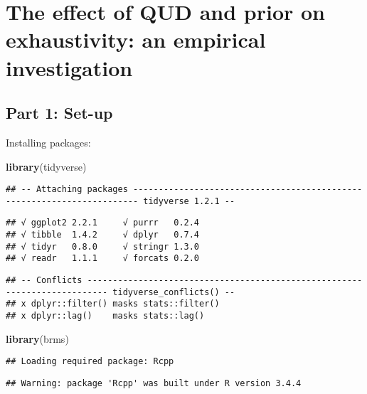 \documentclass[]{article}
\title{}
\author{}
\date{}
\newenvironment{Shaded}{\begin{snugshade}}{\end{snugshade}}
\newcommand{\KeywordTok}[1]{\textcolor[rgb]{0.13,0.29,0.53}{\textbf{#1}}}
\newcommand{\NormalTok}[1]{#1}
\begin{document}
\section{The effect of QUD and prior on exhaustivity: an empirical
investigation}\label{the-effect-of-qud-and-prior-on-exhaustivity-an-empirical-investigation}

\subsection{Part 1: Set-up}\label{part-1-set-up}

Installing packages:

\begin{Shaded}
\begin{Highlighting}[]
\KeywordTok{library}\NormalTok{(tidyverse)}
\end{Highlighting}
\end{Shaded}

\begin{verbatim}
## -- Attaching packages ----------------------------------------------------------------------- tidyverse 1.2.1 --
\end{verbatim}

\begin{verbatim}
## √ ggplot2 2.2.1     √ purrr   0.2.4
## √ tibble  1.4.2     √ dplyr   0.7.4
## √ tidyr   0.8.0     √ stringr 1.3.0
## √ readr   1.1.1     √ forcats 0.2.0
\end{verbatim}

\begin{verbatim}
## -- Conflicts -------------------------------------------------------------------------- tidyverse_conflicts() --
## x dplyr::filter() masks stats::filter()
## x dplyr::lag()    masks stats::lag()
\end{verbatim}

\begin{Shaded}
\begin{Highlighting}[]
\KeywordTok{library}\NormalTok{(brms)}
\end{Highlighting}
\end{Shaded}

\begin{verbatim}
## Loading required package: Rcpp
\end{verbatim}

\begin{verbatim}
## Warning: package 'Rcpp' was built under R version 3.4.4
\end{verbatim}
\end{document}

